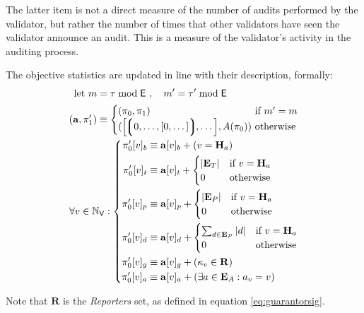The latter item is not a direct measure of the number of audits performed by the validator, but rather the number of times that other validators have seen the validator announce an audit. This is a measure of the validator's activity in the auditing process.

The objective statistics are updated in line with their description, formally:
\begin{align}
    \using m =\; &\tau \bmod \mathsf{E} \ ,\quad m' = \tau' \bmod \mathsf{E}\\
    (\mathbf{a}, \pi'_1) \equiv\;&\begin{cases}
        (\pi_0, \pi_1) &\when m' = m \\
        (\sq{\tuple{0, \dots, [0, \dots]}, \dots}, A(\pi_0))\!\!\!\! &\otherwise
    \end{cases}\!\!\!\!\\
    \forall v \in \N_\mathsf{V} :&\; \left\{\begin{aligned}
        \pi'_0[v]_b &\equiv \mathbf{a}[v]_b + (v = \mathbf{H}_a)\\
        \pi'_0[v]_t &\equiv \mathbf{a}[v]_t + \begin{cases}
            |\mathbf{E}_T| &\when v = \mathbf{H}_a \\
            0 &\otherwise
        \end{cases}\\
        \pi'_0[v]_p &\equiv \mathbf{a}[v]_p + \begin{cases}
            |\mathbf{E}_P| &\when v = \mathbf{H}_a \\
            0 &\otherwise
        \end{cases}\\
        \pi'_0[v]_d &\equiv \mathbf{a}[v]_d + \begin{cases}
            \sum_{d \in \mathbf{E}_P}|d| &\when v = \mathbf{H}_a \\
            0 &\otherwise
        \end{cases}\\
        \pi'_0[v]_g &\equiv \mathbf{a}[v]_g + (\kappa_v \in \mathbf{R})\\
        \pi'_0[v]_a &\equiv \mathbf{a}[v]_a + (\exists a \in \mathbf{E}_A : a_v = v)
    \end{aligned}\right.
\end{align}

Note that $\mathbf{R}$ is the \emph{Reporters} set, as defined in equation \ref{eq:guarantorsig}.